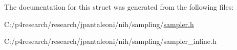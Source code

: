 \-The documentation for this struct was generated from the following files\-:\begin{DoxyCompactItemize}
\item 
\-C\-:/p4research/research/jpantaleoni/nih/sampling/\hyperlink{sampler_8h}{sampler.\-h}\item 
\-C\-:/p4research/research/jpantaleoni/nih/sampling/sampler\-\_\-inline.\-h\end{DoxyCompactItemize}
